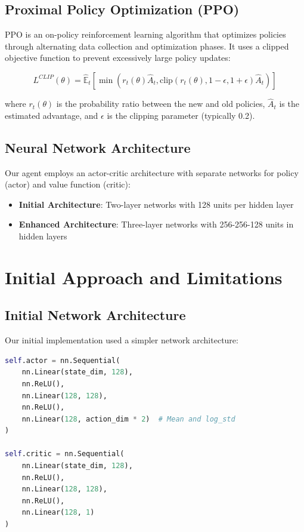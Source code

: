 \documentclass[11pt,a4paper]{article}
\begin{document}
\subsection{Proximal Policy Optimization (PPO)}
PPO is an on-policy reinforcement learning algorithm that optimizes policies through alternating data collection and optimization phases. It uses a clipped objective function to prevent excessively large policy updates:

\begin{equation}
L^{CLIP}(\theta) = \hat{\mathbb{E}}_t \left[ \min(r_t(\theta) \hat{A}_t, \text{clip}(r_t(\theta), 1 - \epsilon, 1 + \epsilon) \hat{A}_t) \right]
\end{equation}

where $r_t(\theta)$ is the probability ratio between the new and old policies, $\hat{A}_t$ is the estimated advantage, and $\epsilon$ is the clipping parameter (typically 0.2).

\subsection{Neural Network Architecture}
Our agent employs an actor-critic architecture with separate networks for policy (actor) and value function (critic):

\begin{itemize}
    \item \textbf{Initial Architecture}: Two-layer networks with 128 units per hidden layer
    \item \textbf{Enhanced Architecture}: Three-layer networks with 256-256-128 units in hidden layers
\end{itemize}

\section{Initial Approach and Limitations}

\subsection{Initial Network Architecture}
Our initial implementation used a simpler network architecture:

\begin{lstlisting}[language=Python,caption=Initial Actor-Critic Network Structure]
self.actor = nn.Sequential(
    nn.Linear(state_dim, 128),
    nn.ReLU(),
    nn.Linear(128, 128),
    nn.ReLU(),
    nn.Linear(128, action_dim * 2)  # Mean and log_std
)

self.critic = nn.Sequential(
    nn.Linear(state_dim, 128),
    nn.ReLU(),
    nn.Linear(128, 128),
    nn.ReLU(),
    nn.Linear(128, 1)
)
\end{lstlisting}
\end{document}
